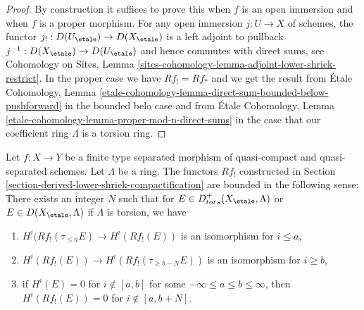 \begin{proof}
By construction it suffices to prove this when $f$ is an open immersion
and when $f$ is a proper morphism. For any open immersion $j : U \to X$
of schemes, the functor $j_! : D(U_\etale) \to D(X_\etale)$ is a left
adjoint to pullback $j^{-1} : D(X_\etale) \to D(U_\etale)$
and hence commutes with direct sums, see Cohomology on Sites, Lemma
\ref{sites-cohomology-lemma-adjoint-lower-shriek-restrict}.
In the proper case we have $Rf_! = Rf_*$ and we get the result from
\'Etale Cohomology, Lemma
\ref{etale-cohomology-lemma-direct-sum-bounded-below-pushforward}
in the bounded belo case and from
\'Etale Cohomology, Lemma \ref{etale-cohomology-lemma-proper-mod-n-direct-sums}
in the case that our coefficient ring $\Lambda$ is a torsion ring.
\end{proof}

\begin{lemma}
\label{lemma-derived-lower-shriek-bounded}
Let $f : X \to Y$ be a finite type separated morphism of quasi-compact
and quasi-separated schemes. Let $\Lambda$ be a ring. The functors $Rf_!$
constructed in Section \ref{section-derived-lower-shriek-compactification}
are bounded in the following sense: There exists an integer $N$ such that
for $E \in D^+_{tors}(X_\etale, \Lambda)$ or $E \in D(X_\etale, \Lambda)$
if $\Lambda$ is torsion, we have
\begin{enumerate}
\item $H^i(Rf_!(\tau_{\leq a}E) \to H^i(Rf_!(E))$ is an isomorphism
for $i \leq a$,
\item $H^i(Rf_!(E)) \to H^i(Rf_!(\tau_{\geq b - N}E))$ is an isomorphism
for $i \geq b$,
\item if $H^i(E) = 0$ for $i \not \in [a, b]$ for some
$-\infty \leq a \leq b \leq \infty$, then $H^i(Rf_!(E)) = 0$
for $i \not \in [a, b + N]$.
\end{enumerate}
\end{lemma}

